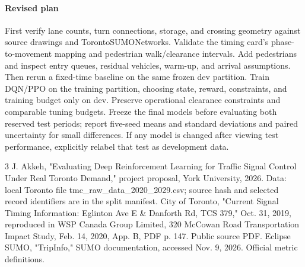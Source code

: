 \documentclass[conference]{IEEEtran}
\begin{document}
\paragraph{Revised plan} First verify lane counts, turn connections, storage, and crossing geometry against source drawings and TorontoSUMONetworks. Validate the timing card's phase-to-movement mapping and pedestrian walk/clearance intervals. Add pedestrians and inspect entry queues, residual vehicles, warm-up, and arrival assumptions. Then rerun a fixed-time baseline on the same frozen dev partition. Train DQN/PPO on the training partition, choosing state, reward, constraints, and training budget only on dev. Preserve operational clearance constraints and comparable tuning budgets. Freeze the final models before evaluating both reserved test periods; report five-seed means and standard deviations and paired uncertainty for small differences. If any model is changed after viewing test performance, explicitly relabel that test as development data.

\begin{thebibliography}{3}
 J. Akkeh, "Evaluating Deep Reinforcement Learning for Traffic Signal Control Under Real Toronto Demand," project proposal, York University, 2026. Data: local Toronto file tmc\_raw\_data\_2020\_2029.csv; source hash and selected record identifiers are in the split manifest.
 City of Toronto, "Current Signal Timing Information: Eglinton Ave E \& Danforth Rd, TCS 379," Oct. 31, 2019, reproduced in WSP Canada Group Limited, 320 McCowan Road Transportation Impact Study, Feb. 14, 2020, App. B, PDF p. 147. Public source PDF.
 Eclipse SUMO, "TripInfo," SUMO documentation, accessed Nov. 9, 2026. Official metric definitions.
\end{thebibliography}
\end{document}
